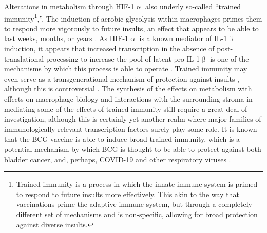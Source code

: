 Alterations in metabolism through HIF\hyp{}1$\upalpha$ also underly so\hyp{}called ``trained immunity\footnote{Trained immunity is a process in which the innate immune system is primed to respond to future insults more effectively. This akin to the way that vaccinations prime the adaptive immune system, but through a completely different set of mechanisms and is non\hyp{}specific, allowing for broad protection against diverse insults.},''. The induction of aerobic glycolysis within macrophages primes them to respond more vigorously to future insults, an effect that appears to be able to last weeks, months, or years \citep{Cheng2014}. As HIF\hyp{}1$\upalpha$ is a known mediator of IL\hyp{}1$\upbeta$ induction, it appears that increased transcription in the absence of post\hyp{}translational processing to increase the pool of latent pro\hyp{}IL\hyp{}1$\upbeta$ is one of the mechanisms by which this process is able to operate \citep{Arts2018}. Trained immunity may even serve as a transgenerational mechanism of protection against insults \citep{Katzmarski2021}, although this is controversial \citep{Kaufmann2022, Katzmarski2022}. The synthesis of the effects on metabolism with effects on macrophage biology and interactions with the surrounding stroma in mediating some of the effects of trained immunity still require a great deal of investigation, although this is certainly yet another realm where major families of immunologically relevant transcription factors surely play some role. It is known that the BCG vaccine is able to induce broad trained immunity, which is a potential mechanism by which BCG is thought to be able to protect against both bladder cancer, and, perhaps, COVID\hyp{}19 and other respiratory viruses \citep{Arts2016, Arts2018, Covian2019, vanPuffelen2020, ONeill2020}.

